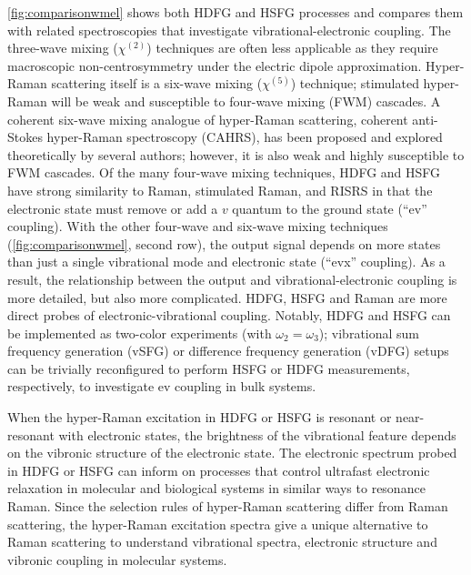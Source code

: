 \documentclass[aip, jcp, reprint, onecolumn, nofootinbib]{revtex4-2}
\begin{document}
\autoref{fig:comparisonwmel} shows both HDFG and HSFG processes and compares them with related spectroscopies that investigate vibrational-electronic coupling.
The three-wave mixing ($\chi^{(2)}$) techniques are often less applicable as they require macroscopic non-centrosymmetry under the electric dipole approximation.\cite{Shen94}
Hyper-Raman scattering itself is a six-wave mixing ($\chi^{(5)}$) technique; stimulated hyper-Raman will be weak and susceptible to four-wave mixing (FWM) cascades.\cite{RN515, RN243, Cho2000_Cascade}
A coherent six-wave mixing analogue of hyper-Raman scattering, coherent anti-Stokes hyper-Raman spectroscopy (CAHRS), has been proposed and explored theoretically by several authors; however, it is also weak and highly susceptible to FWM cascades.\cite{Berger1978, Bjarnason1980, Cho1997, Cho1998}
Of the many four-wave mixing techniques, HDFG and HSFG have strong similarity to Raman, stimulated Raman, and RISRS in that the electronic state must remove or add a $v$ quantum to the ground state (``ev'' coupling).
With the other four-wave and six-wave mixing techniques (\autoref{fig:comparisonwmel}, second row), the output signal depends on more states than just a single vibrational mode and electronic state (``evx'' coupling).\cite{RN445, RN335} 
As a result, the relationship between the output and vibrational-electronic coupling is more detailed, but also more complicated.
HDFG, HSFG and Raman are more direct probes of electronic-vibrational coupling.
Notably, HDFG and HSFG can be implemented as two-color experiments (with $\omega_2=\omega_3$);\cite{Cho2001} vibrational sum frequency generation (vSFG) or difference frequency generation (vDFG) setups can be trivially reconfigured to perform HSFG or HDFG measurements, respectively, to investigate ev coupling in bulk systems.

When the hyper-Raman excitation in HDFG or HSFG is resonant or near-resonant with electronic states, the brightness of the vibrational feature depends on the vibronic structure of the electronic state.
The electronic spectrum probed in HDFG or HSFG can inform on processes that control ultrafast electronic relaxation in molecular and biological systems in similar ways to resonance Raman.\cite{Cho2001, Bredenbeck2015, Arsenault2021}
Since the selection rules of hyper-Raman scattering differ from Raman scattering, the hyper-Raman excitation spectra give a unique alternative to Raman scattering to understand vibrational spectra, electronic structure and vibronic coupling in molecular systems. \cite{Olson2018}
\end{document}
